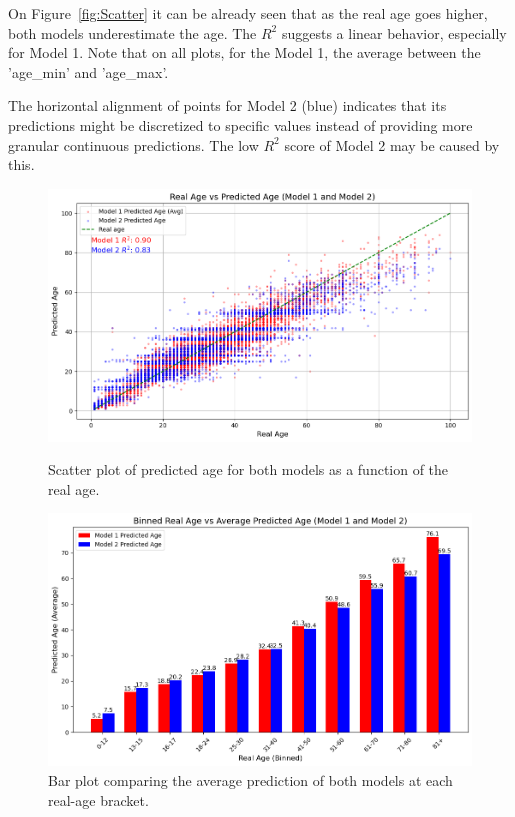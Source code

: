 \documentclass{article}
\begin{document}
On Figure~\ref{fig:Scatter} it can be already seen that as the real age goes higher, both models underestimate the age. The $R^2$ suggests a linear behavior, especially for Model 1. Note that on all plots, for the Model 1, the average between the 'age\_min' and 'age\_max'. 

The horizontal alignment of points for Model 2 (blue) indicates that its predictions might be discretized to specific values instead of providing more granular continuous predictions. The low $R^2$ score of Model 2 may be caused by this.



\begin{figure}[h]
    \centering
    \begin{minipage}{0.49\textwidth}
        \centering
        \includegraphics[width=\textwidth]{images/0_Scatter_Real_vs_prediction_Refined_dropNan_A.png}
        \caption{Scatter plot of predicted age for both models as a function of the real age.}
        \label{fig:Scatter}
    \end{minipage}
    \hfill
    \begin{minipage}{0.49\textwidth}
        \centering
        \includegraphics[width=\textwidth]{images/2_Bars_Real_vs_prediction_dorpnan.png}
        \caption{Bar plot comparing the average prediction of both models at each real-age bracket.}
        \label{fig:Bar}
    \end{minipage}
\end{figure}
\end{document}

